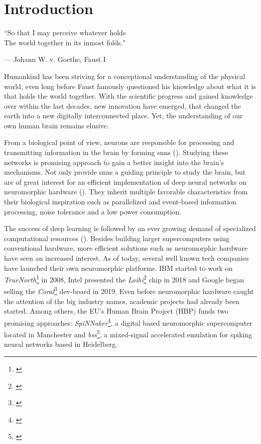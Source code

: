 \chapter{Introduction}

\epigraph{``So that I may perceive whatever holds \\The world together in its inmost folds."}{--- \textup{Johann W. v. Goethe}, Faust I}

Humankind has been striving for a conceptional understanding of the physical world, even long before Faust famously questioned his knowledge about what it is that holds the world together. With the scientific progress and gained knowledge over within the last decades, new innovation have emerged, that changed the earth into a new digitally interconnected place. Yet, the understanding of our own human brain remains elusive.

From a biological point of view, neurons are responsible for processing and transmitting information in the brain by forming \glspl{snn} (\citealp{gerstner2014dynamics}). Studying these networks is promising approach to gain a better insight into the brain's mechanisms. Not only provide \glspl{snn} a guiding principle to study the brain, but are of great interest for an efficient implementation of deep neural networks on neuromorphic hardware (\citealp{pfeiffer2018deep}). They inherit multiple favorable characteristics from their biological inspiration such as parallelized and event-based information processing, noise tolerance and a low power consumption.

The success of deep learning is followed by an ever growing demand of specialized computational resources (\citealp{mayer2020scalable}). Besides building larger supercomputers using conventional hardware, more efficient solutions such as neuromorphic hardware have seen an increased interest. As of today, several well known tech companies have launched their own neuromorphic platforms. IBM started to work on \emph{TrueNorth}\footnote{\citealp{akopyan2015truenorth}} in 2008, Intel presented the \emph{Loihi}\footnote{\citealp{davies2018loihi}} chip in 2018 and Google began selling the \emph{Coral}\footnote{\citealp{cass2019taking}} dev-board in 2019. Even before neuromorphic hardware caught the attention of the big industry names, academic projects had already been started. Among others, the EU's Human Brain Project (HBP) funds two promising approaches: \emph{SpiNNaker}\footnote{\citealp{furber2014spinnaker}}, a digital based neuromorphic supercomputer located in Manchester and \emph{\gls{bss}}\footnote{\citealp{brainscales_webpublic}}, a mixed-signal accelerated emulation for spiking neural networks based in Heidelberg.

